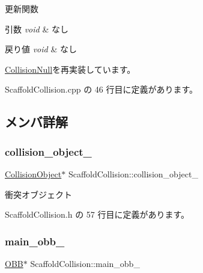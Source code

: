 更新関数 


\begin{DoxyParams}{引数}
{\em void} & なし \\
\hline
\end{DoxyParams}

\begin{DoxyRetVals}{戻り値}
{\em void} & なし \\
\hline
\end{DoxyRetVals}


\mbox{\hyperlink{class_collision_null_ad6ac0e9b06fcb4e3d19a5c3c1cadfe7e}{Collision\+Null}}を再実装しています。



 Scaffold\+Collision.\+cpp の 46 行目に定義があります。



\subsection{メンバ詳解}
\mbox{\label{class_scaffold_collision_a591e2714cf3e63f7001a8fff676e64f5}} 
\subsubsection{\texorpdfstring{collision\+\_\+object\+\_\+}{collision\_object\_}}
{\footnotesize\ttfamily \mbox{\hyperlink{class_collision_object}{Collision\+Object}}$\ast$ Scaffold\+Collision\+::collision\+\_\+object\+\_\+\hspace{0.3cm}{\ttfamily [private]}}



衝突オブジェクト 



 Scaffold\+Collision.\+h の 57 行目に定義があります。

\mbox{\label{class_scaffold_collision_a2d76e8aec6603cbe59d6811205b39acd}} 
\subsubsection{\texorpdfstring{main\+\_\+obb\+\_\+}{main\_obb\_}}
{\footnotesize\ttfamily \mbox{\hyperlink{class_o_b_b}{O\+BB}}$\ast$ Scaffold\+Collision\+::main\+\_\+obb\+\_\+\hspace{0.3cm}{\ttfamily [private]}}



